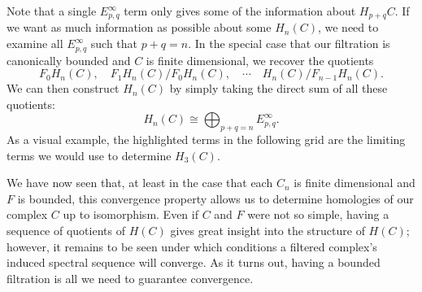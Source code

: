 \documentclass[twoside,10pt]{article}
\begin{document}
Note that a single $E_{p,q}^{\infty}$ term only gives some of the information about $H_{p+q}C$. If we want as much information as possible about some $H_{n}(C)$, we need to examine all $E_{p,q}^{\infty}$ such that $p+q=n$. In the special case that our filtration is canonically bounded and $C$ is finite dimensional,  we recover the quotients
\[
	F_{0}H_{n}(C), \quad F_1H_{n}(C)/F_{0}H_{n}(C), \quad \cdots \quad H_{n}(C)/F_{n-1}H_{n}(C).
\]
We can then construct $H_{n}(C)$ by simply taking the direct sum of all these quotients:
\[
	H_{n}(C) \cong \bigoplus_{p+q=n}E_{p,q}^{\infty}.
\] 
As a visual example, the highlighted terms in the following grid are the limiting terms we would use to determine $H_{3}(C)$.
\begin{center}
\end{center}

We have now seen that, at least in the case that each $C_{n}$ is finite dimensional and $F$ is bounded, this convergence property allows us to determine homologies of our complex $C$ up to isomorphism. Even if $C$ and $F$ were not so simple, having a sequence of quotients of $H(C)$ gives great insight into the structure of $H(C)$; however, it remains to be seen under which conditions a filtered complex's induced spectral sequence will converge. As it turns out, having a bounded filtration is all we need to guarantee convergence.
\end{document}
